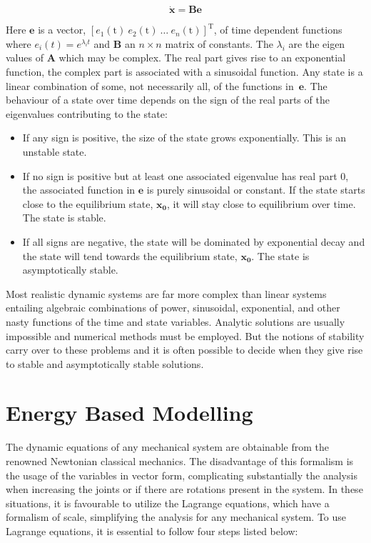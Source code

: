 \documentclass{UoNMCHA}
\numberwithin{equation}{section}
\begin{document}
	\begin{equation}
	\mathbf{\dot{x}=Be}
	\end{equation}
	
	Here $\mathbf{e}$ is a vector, $\left[e_1\mathrm{(t)\ } e_2\mathrm{(t)\ } \ldots\mathrm{\ } e_n\mathrm{(t)} \right]^\mathrm{T}$, of time dependent functions where  $e_i\left(t\right)=e^{\lambda_it}$ and $\mathbf{B}$ an $n\times n$ matrix of constants. The $\lambda_i$ are the eigen values of $\mathbf{A}$ which may be complex. The real part gives rise to an exponential function, the complex part is associated with a sinusoidal function.  Any state is a linear combination of some, not necessarily all, of the functions in\ $\mathbf{e}$. The behaviour of a state over time depends on the sign of the real parts of the eigenvalues contributing to the state:
	
	\begin{itemize}
		\item	If any sign is positive, the size of the state grows exponentially. This is an unstable state.
		
		\item	If no sign is positive but at least one associated eigenvalue has real part 0, the associated function in $\mathbf{e}$ is purely sinusoidal or constant. If the state starts close to the equilibrium state, $\mathbf{x}_\mathbf{0}$, it will stay close to equilibrium over time. The state is stable.
		
		\item	If all signs are negative, the state will be dominated by exponential decay and the state will tend towards the equilibrium state, $\mathbf{x}_\mathbf{0}$. The state is asymptotically stable.
	\end{itemize}
	
	Most realistic dynamic systems are far more complex than linear systems entailing algebraic combinations of power, sinusoidal, exponential, and other nasty functions of the time and state variables. Analytic solutions are usually impossible and numerical methods must be employed. But the notions of stability carry over to these problems and it is often possible to decide when they give rise to stable and asymptotically stable solutions.
	
	
	\section{Energy Based Modelling}\label{Energy Based Modelling}
	
	The dynamic equations of any mechanical system are obtainable from the renowned Newtonian classical mechanics. The disadvantage of this formalism is the usage of the variables in vector form, complicating substantially the analysis when increasing the joints or if there are rotations present in the system. In these situations, it is favourable to utilize the Lagrange equations, which have a formalism of scale, simplifying the analysis for any mechanical system. To use Lagrange equations, it is essential to follow four steps listed below:
	
\end{document}
